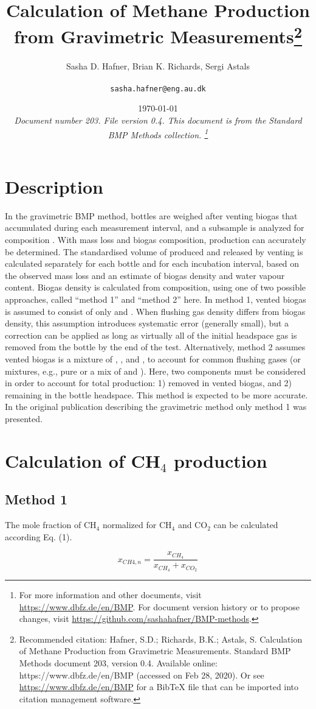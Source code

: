 \documentclass[]{article}
\title {Calculation of Methane Production from Gravimetric Measurements\footnote{
  Recommended citation: 
Hafner, S.D.; Richards, B.K.; Astals, S. Calculation of Methane Production from Gravimetric Measurements. Standard BMP Methods document 203, version 0.4. Available online: https://www.dbfz.de/en/BMP (accessed on Feb 28, 2020).
  \newline
  Or see \url{https://www.dbfz.de/en/BMP} for a BibTeX file that can be imported into citation management software.
}}
\author{Sasha D. Hafner, Brian K. Richards, Sergi Astals\\
\\
\texttt{sasha.hafner@eng.au.dk}
}
\date{\today \\
\bigskip
\textit{
  Document number 203.
  File version 0.4. 
  This document is from the Standard BMP Methods collection.
    \footnote{For more information and other documents, visit \url{https://www.dbfz.de/en/BMP}. 
    For document version history or to propose changes, visit \url{https://github.com/sashahafner/BMP-methods}.}
}
}
\begin{document}
\maketitle

\section{Description}
In the gravimetric BMP method, bottles are weighed after venting biogas that accumulated during each measurement interval, and a subsample is analyzed for composition \cite{validation}.
With mass loss and biogas composition,  production can accurately be determined.
The standardised volume of  produced and released by venting is calculated separately for each bottle and for each incubation interval, based on the observed mass loss and an estimate of biogas density and water vapour content. 
Biogas density is calculated from composition, using one of two possible approaches, called ``method 1'' and ``method 2'' here.
In method 1, vented biogas is assumed to consist of only  and . 
When flushing gas density differs from biogas density, this assumption introduces systematic error (generally small), but a correction can be applied as long as virtually all of the initial headspace gas is removed from the bottle by the end of the test. 
Alternatively, method 2 assumes vented biogas is a mixture of , , and , to account for common flushing gases (or mixtures, e.g., pure  or a mix of  and ).
Here, two components must be considered in order to account for total  production: 1)  removed in vented biogas, and 2)  remaining in the bottle headspace.
This method is expected to be more accurate.
In the original publication describing the gravimetric method \cite{validation} only method 1 was presented.

\section{Calculation of CH$_4$ production}

\subsection{Method 1}

The mole fraction of CH$_{4}$ normalized for CH$_{4}$ and CO$_{2}$ can be calculated according Eq. (1). 

\begin{equation}
  \label{eq:xch4n}
    x_{CH{4},n} = \frac{x_{CH_4}}{x_{CH_4} + x_{CO_2}}
\end{equation}
\end{document}
